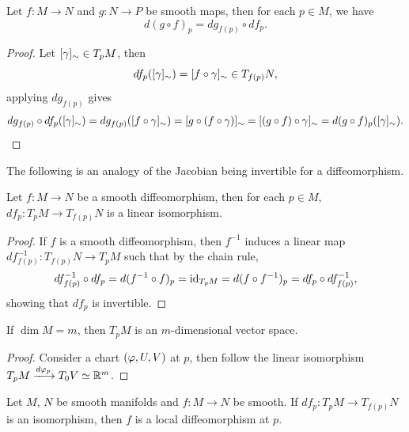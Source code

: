 \begin{theorem}
  Let \(f:M\to N\) and \(g:N\to P\) be smooth maps, then for each \(p\in M\), we have \[
    d(g\circ f)_p = dg_{f(p)} \circ df_p.
  \]
\end{theorem}
\begin{proof}
  Let \([\gamma]_\sim\in T_pM\), then \[
    df_p([\gamma]_\sim) = [f\circ\gamma]_\sim \in T_{f(p)}N,
  \]
  applying \(dg_{f(p)}\) gives \begin{align*}
    dg_{f(p)}\circ df_p([\gamma]_\sim)
    = dg_{f(p)}([f\circ\gamma]_\sim)
    = [g\circ (f\circ\gamma)]_\sim
    = [(g\circ f)\circ\gamma]_\sim
    = d(g\circ f)_p([\gamma]_\sim).
  \end{align*}
\end{proof}

The following is an analogy of the Jacobian being invertible for a diffeomorphism.
\begin{proposition}
  Let \(f:M\to N\) be a smooth diffeomorphism, then for each \(p\in M\), \(df_p:T_pM\to T_{f(p)}N\) is a linear isomorphism.
\end{proposition}
\begin{proof}
  If \(f\) is a smooth diffeomorphism, then \(f^{-1}\) induces a linear map \(df^{-1}_{f(p)}:T_{f(p)}N\to T_pM\) such that by the chain rule, \[
    df^{-1}_{f(p)}\circ df_p
    = d(f^{-1}\circ f)_p
    = \mathrm{id}_{T_pM}
    = d(f\circ f^{-1})_p
    = df_p\circ df^{-1}_{f(p)},
  \] showing that \(df_p\) is invertible.
\end{proof}

\begin{corollary}
  If \(\dim M = m\), then \(T_p M\) is an \(m\)-dimensional vector space.
\end{corollary}
\begin{proof}
  Consider a chart \((\varphi,U,V)\) at \(p\), then follow the linear isomorphism \(T_pM \xlongrightarrow{d\f_p} T_0V \simeq \R^m\).
\end{proof}


\begin{theorem}
  Let \(M\), \(N\) be smooth manifolds and \(f:M\to N\) be smooth. If \(df_p:T_pM\to T_{f(p)}N\) is an isomorphism, then \(f\) is a local diffeomorphism at \(p\).
\end{theorem}

